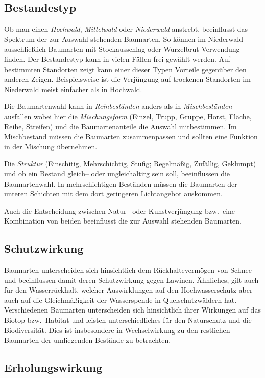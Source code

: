 \documentclass[twocolumn]{scrartcl}
\begin{document}
\subsection{Bestandestyp}
\label{ssec:bestandestyp}

Ob man einen \emph{Hochwald}, \emph{Mittelwald} oder \emph{Niederwald}
anstrebt, beeinflusst das Spektrum der zur Auswahl stehenden
Baumarten. So können im Niederwald ausschließlich Baumarten mit
Stockausschlag oder Wurzelbrut Verwendung finden. Der Bestandestyp
kann in vielen Fällen frei gewählt werden. Auf bestimmten Standorten
zeigt kann einer dieser Typen Vorteile gegenüber den anderen
Zeigen. Beispielsweise ist die Verjüngung auf trockenen Standorten im
Niederwald meist einfacher als in Hochwald.

Die Baumartenwahl kann in \emph{Reinbeständen} anders als in
\emph{Mischbeständen} ausfallen wobei hier die \emph{Mischungsform}
(Einzel, Trupp, Gruppe, Horst, Fläche, Reihe, Streifen) und die
Baumartenanteile die Auswahl mitbestimmen. Im Mischbestand müssen die
Baumarten zusammenpassen und sollten eine Funktion in der Mischung
übernehmen.

Die \emph{Struktur} (Einschitig, Mehrschichtig, Stufig; Regelmäßig,
Zufällig, Geklumpt) und ob ein Bestand gleich-- oder ungleichaltirg
sein soll, beeinflussen die Baumartenwahl. In mehrschichtigen
Beständen müssen die Baumarten der unteren Schichten mit dem dort
geringeren Lichtangebot auskommen.

Auch die Entscheidung zwischen Natur-- oder Kunstverjüngung bzw.\ eine
Kombination von beiden beeinflusst die zur Auswahl stehenden
Baumarten.

\subsection{Schutzwirkung}
\label{ssec:schutz}

Baumarten unterscheiden sich hinsichtlich dem Rückhaltevermögen von
Schnee und beeinflussen damit deren Schutzwirkung gegen
Lawinen. Ähnliches, gilt auch für den Wasserrückhalt, welcher
Auswirklungen auf den Hochwasserschutz aber auch auf die
Gleichmäßigkeit der Wasserspende in Quelschutzwäldern
hat. Verschiedenen Baumarten unterscheiden sich hinsichtlich ihrer
Wirkungen auf das Biotop bzw.\ Habitat und leisten unterschiedliches
für den Naturschutz und die Biodiversität. Dies ist insbesondere in
Wechselwirkung zu den restlichen Baumarten der umliegenden Bestände zu
betrachten.

\subsection{Erholungswirkung}
\label{ssec:erholung}
\end{document}
